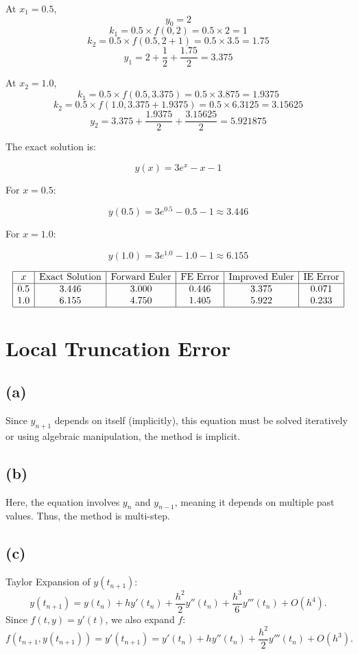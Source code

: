 \documentclass{article}
\begin{document}
At $ x_1 = 0.5 $,
$$ y_0 = 2 $$
$$ k_1 = 0.5\times f(0,2) = 0.5\times  2 = 1 $$
$$ k_2 = 0.5\times f(0.5, 2 + 1) = 0.5\times 3.5 = 1.75 $$
$$ y_1 = 2 + \frac{1}{2}+ \frac{1.75}{2}= 3.375 $$

At $ x_2 = 1.0 $,
$$ k_1 = 0.5\times f(0.5, 3.375) = 0.5 \times 3.875 = 1.9375 $$
$$ k_2 = 0.5 \times f(1.0, 3.375 + 1.9375) = 0.5 \times 6.3125 = 3.15625 $$
$$ y_2 = 3.375 + \frac{1.9375}{2} + \frac{3.15625}{2}=5.921875 $$

The exact solution is:

$$
    y(x) = 3e^x - x - 1
$$

For $ x = 0.5 $:

$$
    y(0.5) = 3e^{0.5} - 0.5 - 1 \approx 3.446
$$

For $ x = 1.0 $:

$$
    y(1.0) = 3e^{1.0} - 1.0 - 1 \approx 6.155
$$

$$
    \begin{array}{|c|c|c|c|c|c|}
        \hline
        x   & \text{Exact Solution} & \text{Forward Euler} & \text{FE Error} & \text{Improved Euler} & \text{IE Error} \\
        \hline
        0.5 & 3.446                 & 3.000                & 0.446           & 3.375                 & 0.071           \\
        1.0 & 6.155                 & 4.750                & 1.405           & 5.922                 & 0.233           \\
        \hline
    \end{array}
$$

\newpage
\section{Local Truncation Error}
\subsection*{(a)}
Since $ y_{n+1} $ depends on itself (implicitly), this equation must be solved iteratively or using algebraic manipulation, the method is implicit.

\subsection*{(b)}
Here, the equation involves $ y_n $ and $ y_{n-1} $, meaning it depends on multiple past values. Thus, the method is multi-step.

\subsection*{(c)}
Taylor Expansion of $y(t_{n+1})$:
$$
    y(t_{n+1}) = y(t_n) + h y'(t_n) + \frac{h^2}{2} y''(t_n) + \frac{h^3}{6} y'''(t_n) + O(h^4).
$$
Since $ f(t, y) = y'(t) $, we also expand $ f $:
$$
    f(t_{n+1}, y(t_{n+1})) = y'(t_{n+1}) = y'(t_n) + h y''(t_n) + \frac{h^2}{2} y'''(t_n) + O(h^3).
$$
\end{document}

